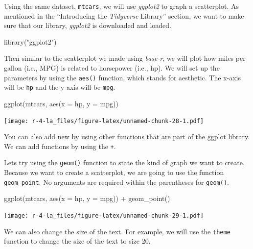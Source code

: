 \documentclass[
]{book}
\newenvironment{Shaded}{\begin{snugshade}}{\end{snugshade}}
\newcommand{\AttributeTok}[1]{\textcolor[rgb]{0.77,0.63,0.00}{#1}}
\newcommand{\FunctionTok}[1]{\textcolor[rgb]{0.00,0.00,0.00}{#1}}
\newcommand{\NormalTok}[1]{#1}
\newcommand{\SpecialCharTok}[1]{\textcolor[rgb]{0.00,0.00,0.00}{#1}}
\newcommand{\StringTok}[1]{\textcolor[rgb]{0.31,0.60,0.02}{#1}}
\begin{document}
Using the same dataset, \texttt{mtcars}, we will use \emph{ggplot2} to graph a scatterplot. As mentioned in the ``Introducing the \emph{Tidyverse} Library'' section, we want to make sure that our library, \emph{ggplot2} is downloaded and loaded.

\begin{Shaded}
\begin{Highlighting}[]
\FunctionTok{library}\NormalTok{(}\StringTok{"ggplot2"}\NormalTok{)}
\end{Highlighting}
\end{Shaded}

Then similar to the scatterplot we made using \emph{base-r}, we will plot how miles per gallon (i.e., MPG) is related to horsepower (i.e., hp). We will set up the parameters by using the \texttt{aes()} function, which stands for aesthetic. The x-axis will be \texttt{hp} and the y-axis will be \texttt{mpg}.

\begin{Shaded}
\begin{Highlighting}[]
\FunctionTok{ggplot}\NormalTok{(mtcars, }
       \FunctionTok{aes}\NormalTok{(}\AttributeTok{x =}\NormalTok{ hp, }\AttributeTok{y =}\NormalTok{ mpg))}
\end{Highlighting}
\end{Shaded}

\texttt{[image: r-4-la\_files/figure-latex/unnamed-chunk-28-1.pdf]}

You can also add new by using other functions that are part of the ggplot library. We can add functions by using the \texttt{+}.

Lets try using the \texttt{geom()} function to state the kind of graph we want to create. Because we want to create a scatterplot, we are going to use the function \texttt{geom\_point}. No arguments are required within the parentheses for \texttt{geom()}.

\begin{Shaded}
\begin{Highlighting}[]
\FunctionTok{ggplot}\NormalTok{(mtcars, }\FunctionTok{aes}\NormalTok{(}\AttributeTok{x =}\NormalTok{ hp, }\AttributeTok{y =}\NormalTok{ mpg)) }\SpecialCharTok{+} 
      \FunctionTok{geom\_point}\NormalTok{()}
\end{Highlighting}
\end{Shaded}

\texttt{[image: r-4-la\_files/figure-latex/unnamed-chunk-29-1.pdf]}

We can also change the size of the text. For example, we will use the \texttt{theme} function to change the size of the text to size 20.
\end{document}
